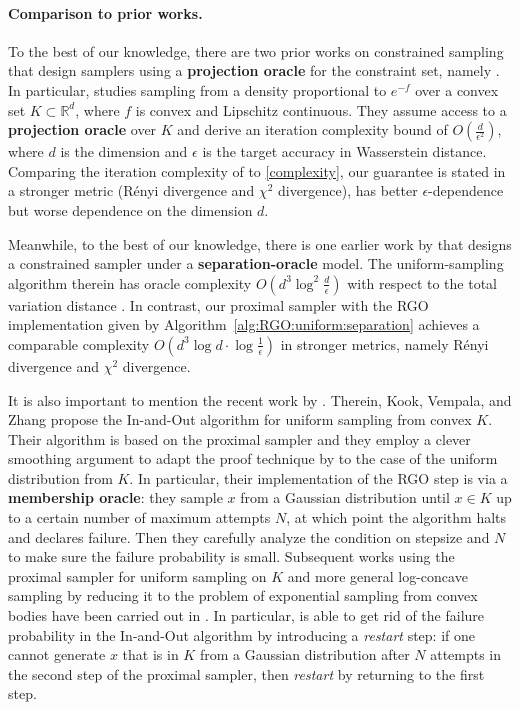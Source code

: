 \documentclass[11pt,letterpaper]{article}
\begin{document}
\paragraph*{Comparison to prior works.}
 To the best of our knowledge, there are two prior works on constrained sampling that design samplers using a \textbf{projection oracle} for the constraint set, namely \cite{Bubeck2018,Lehec2023}. In particular, \cite{Lehec2023} studies sampling from a density proportional to $e^{-f}$ over a convex set $K\subset\mathbb{R}^d$, where $f$ is convex and Lipschitz continuous. They assume access to a \textbf{projection oracle} over $K$ and derive an iteration complexity bound of $O\!\left(\frac{d}{\epsilon^{2}}\right)$, where $d$ is the dimension and $\epsilon$ is the target accuracy in Wasserstein distance. Comparing the iteration complexity of \cite{Lehec2023} to \eqref{complexity}, our guarantee is stated in a stronger metric (R\'enyi divergence and $\chi^{2}$ divergence), has better $\epsilon$-dependence but worse dependence on the dimension $d$.

Meanwhile, to the best of our knowledge, there is one earlier work by \cite{kannan1997random} that designs a constrained sampler under a \textbf{separation-oracle} model. The uniform-sampling algorithm therein has oracle complexity $O\!\left(d^{3} \log^{2}\!\frac{d}{\epsilon}\right)$ with respect to the total variation distance \cite[Theorems~2.2 and~4.14]{kannan1997random}. In contrast, our proximal sampler with the RGO implementation given by Algorithm~\ref{alg:RGO:uniform:separation} achieves a comparable complexity $O\!\left(d^{3}\log d \cdot \log\frac{1}{\epsilon}\right)$ in stronger metrics, namely R\'enyi divergence and $\chi^{2}$ divergence.





It is also important to mention the recent work by \cite{kook2024inandout}. Therein, Kook, Vempala, and Zhang  propose the In-and-Out algorithm for uniform sampling from convex $K$. Their algorithm is based on the proximal sampler and they employ a clever smoothing argument to adapt the proof technique by \cite{chen2022improved} to the case of the uniform distribution from $K$. In particular, their implementation of the RGO step is via a \textbf{membership oracle}: they sample $x$ from a Gaussian distribution until $x\in K$ up to a certain number of maximum attempts $N$, at which point the algorithm halts and declares failure. Then they carefully analyze the condition on stepsize and $N$ to make sure the failure probability is small. Subsequent works using the proximal sampler for uniform sampling on $K$ and more general log-concave sampling by reducing it to the problem of exponential sampling from convex bodies have been carried out in \cite{kook2025algodiffusion,kook2025coldstart,kook2025zeroth}. In particular, \cite{kook2025zeroth} is able to get rid of the failure probability in the In-and-Out algorithm by introducing a \textit{restart} step: if one cannot generate $x$ that is in $K$ from a Gaussian distribution after $N$ attempts in the second step of the proximal sampler, then \textit{restart} by returning to the first step.  
\end{document}

